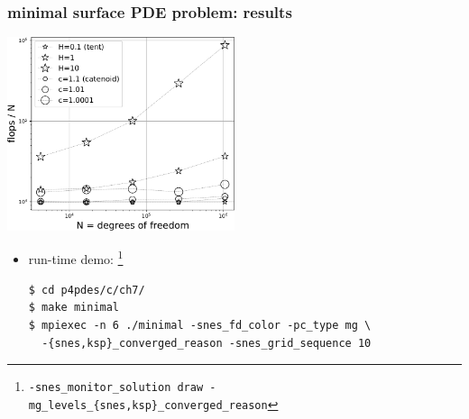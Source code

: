 \documentclass[10pt,
               svgnames,
               hyperref={colorlinks,citecolor=DeepPink4,linkcolor=FireBrick,urlcolor=Maroon},
               usepdftitle=false]{beamer}
\newcommand\blfootnote[1]{%
  \begingroup
  \renewcommand\thefootnote{}\footnote{#1}%
  \addtocounter{footnote}{-1}%
  \endgroup
}
\begin{document}
\begin{frame}[fragile]
\frametitle{minimal surface PDE problem: results}

\begin{center}
\includegraphics[width=0.5\textwidth]{images/minimal-flopsperdof.png}
\end{center}

\begin{itemize}
\item<2> run-time demo:\blfootnote{{\tiny \texttt{-snes\_monitor\_solution draw -mg\_levels\_\{snes,ksp\}\_converged\_reason}}}

\begin{Verbatim}
$ cd p4pdes/c/ch7/
$ make minimal
$ mpiexec -n 6 ./minimal -snes_fd_color -pc_type mg \
  -{snes,ksp}_converged_reason -snes_grid_sequence 10
\end{Verbatim}
\bigskip
\end{itemize}
\end{frame}
\end{document}
